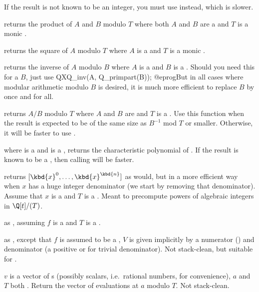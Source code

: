 If the result is not known to be an integer, you must use 
instead, which is slower.

 returns the product of $A$ and $B$
modulo $T$ where both $A$ and $B$ are a  and $T$ is a monic .

 returns the square of $A$
modulo $T$ where $A$ is a  and $T$ is a monic .

 returns the inverse of $A$ modulo $B$
where $A$ is a  and $B$ is a . Should you need this for
a  $B$, just use
\bprog
  QXQ_inv(A, Q_primpart(B));
@eprog\noindent But in all cases where modular arithmetic modulo $B$ is
desired, it is much more efficient to replace $B$ by 
once and for all.

 returns $A/B$ modulo $T$
where $A$ and $B$ are  and $T$ is a . Use this function
when the result is expected to be of the same size as $B^{-1}$ mod $T$
or smaller.
Otherwise, it will be faster to use .

 where  is a  and
 is a , returns the characteristic polynomial of .
If the result is known to be a , then calling  will
be faster.

 returns $[\kbd{x}^0, \dots,
\kbd{x}^\kbd{n}]$ as  would, but in a more efficient way when
$x$ has a huge integer denominator (we start by removing that denominator).
Assume that $x$ is a  and $T$ is a . Meant to precompute
powers of algebraic integers in $\Q[t]/(T)$.

 as , assuming $f$
is a  and $T$ is a .

 as ,
except that $f$ is assumed to be a , $V$ is given implicitly
by a numerator  () and denominator  (a positive
 or  for trivial denominator). Not stack-clean, but
suitable for .

 $v$ is a vector of s
(possibly scalars, i.e.~rational numbers, for convenience), $a$ and $T$ both
. Return the vector of evaluations at $a$ modulo $T$.
Not stack-clean.

